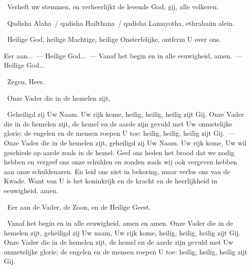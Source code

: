 \documentclass[12pt,twoside,a5paper]{article}
\begin{document}
\dd~Verheft uw stemmen, en verheerlijkt de levende God, gij, alle volkeren.

\begin{doublecols}
  \fontsize{11}{12}\selectfont

  \dutchl \rr~Qadisha Alaha~/ qadisha Hailthana~/ qadisha Lamayotha, ethrahaim alein.

   \rr~Heilige God, heilige Machtige, heilige Onsterfelijke, ontferm U over ons.
\end{doublecols}

\begin{halfparskip}
  Eer aan...~--- Heilige God...~--- Vanaf het begin en in alle eeuwigheid, amen.~--- Heilige God...

  \dd~Zegen, Heer.

  \cc~Onze Vader die in de hemelen zijt,

  \rr~Geheiligd zij Uw Naam. Uw rijk kome, heilig, heilig, heilig zijt Gij. Onze Vader die in de hemelen zijt, de hemel en de aarde zijn gevuld met Uw onmetelijke glorie; de engelen en de mensen roepen U toe: heilig, heilig, heilig zijt Gij.~--- Onze Vader die in de hemelen zijt, geheiligd zij Uw Naam. Uw rijk kome, Uw wil geschiede op aarde zoals in de hemel. Geef ons heden het brood dat we nodig hebben en vergeef ons onze schulden en zonden zoals wij ook vergeven hebben aan onze schuldenaren. En leid ons niet in bekoring, maar verlos ons van de Kwade. Want van U is het koninkrijk en de kracht en de heerlijkheid in eeuwigheid, amen.

  \cc~Eer aan de Vader, de Zoon, en de Heilige Geest.

  \rr~Vanaf het begin en in alle eeuwigheid, amen en amen. Onze Vader die in de hemelen zijt, geheiligd zij Uw naam, Uw rijk kome, heilig, heilig, heilig zijt Gij. Onze Vader die in de hemelen zijt, de hemel en de aarde zijn gevuld met Uw onmetelijke glorie; de engelen en de mensen roepen U toe: heilig, heilig, heilig zijt Gij.

\end{halfparskip}
\end{document}
